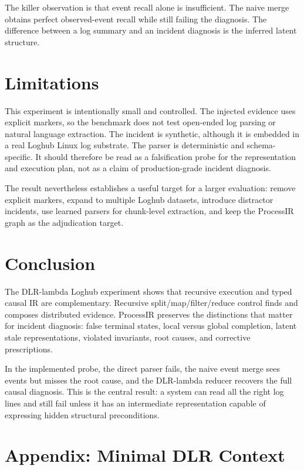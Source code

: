\documentclass[11pt]{article}
\newcommand{\code}[1]{\texttt{\detokenize{#1}}}
\begin{document}
The killer observation is that event recall alone is insufficient. The naive
merge obtains perfect observed-event recall while still failing the diagnosis.
The difference between a log summary and an incident diagnosis is the inferred
latent structure.

\section{Limitations}

This experiment is intentionally small and controlled. The injected evidence
uses explicit \code{DLR_LAMBDA} markers, so the benchmark does not test
open-ended log parsing or natural language extraction. The incident is synthetic,
although it is embedded in a real Loghub Linux log substrate. The parser is
deterministic and schema-specific. It should therefore be read as a
falsification probe for the representation and execution plan, not as a claim of
production-grade incident diagnosis.

The result nevertheless establishes a useful target for a larger evaluation:
remove explicit markers, expand to multiple Loghub datasets, introduce distractor
incidents, use learned parsers for chunk-level extraction, and keep the ProcessIR
graph as the adjudication target.

\section{Conclusion}

The DLR-lambda Loghub experiment shows that recursive execution and typed causal
IR are complementary. Recursive split/map/filter/reduce control finds and
composes distributed evidence. ProcessIR preserves the distinctions that matter
for incident diagnosis: false terminal states, local versus global completion,
latent stale representations, violated invariants, root causes, and corrective
prescriptions.

In the implemented probe, the direct parser fails, the naive event merge sees
events but misses the root cause, and the DLR-lambda reducer recovers the full
causal diagnosis. This is the central result: a system can read all the right log
lines and still fail unless it has an intermediate representation capable of
expressing hidden structural preconditions.

\appendix

\section{Appendix: Minimal DLR Context}
\end{document}
